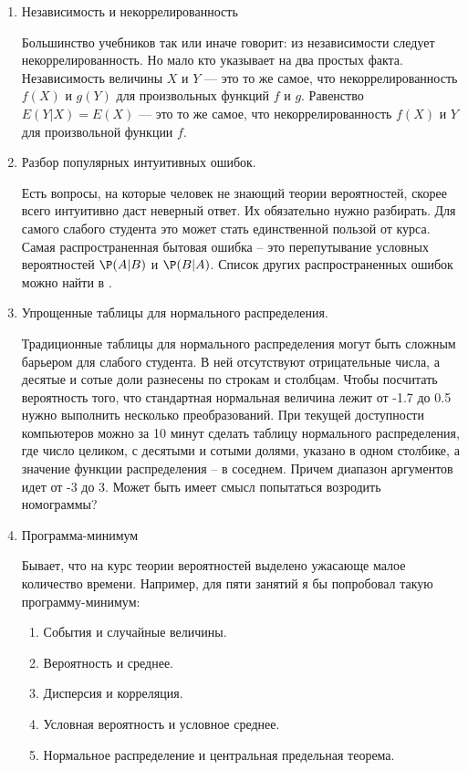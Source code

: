 \documentclass[pdftex,12pt,a4paper]{article}
\begin{document}
\begin{enumerate}
\item Независимость и некоррелированность

Большинство учебников так или иначе говорит: из независимости следует некоррелированность. Но мало кто указывает на два простых факта. Независимость величины $X$ и $Y$ --- это то же самое, что некоррелированность $f(X)$ и $g(Y)$ для произвольных  функций $f$ и $g$. Равенство $E(Y|X)=E(X)$ --- это то же самое, что некоррелированность $f(X)$ и $Y$ для произвольной  функции $f$.


\item Разбор популярных интуитивных ошибок.

Есть вопросы, на которые человек не знающий теории вероятностей, скорее всего интуитивно даст неверный ответ. Их обязательно нужно разбирать. Для самого слабого студента это может стать единственной пользой от курса. Самая распространенная бытовая ошибка – это перепутывание условных вероятностей $\P(A|B)$ и $\P(B|A)$. Список других распространенных ошибок можно найти в \cite{fischbein:misconceptions}.

\item Упрощенные таблицы для нормального распределения. 

Традиционные таблицы для нормального распределения могут быть сложным барьером для слабого студента. В ней отсутствуют отрицательные числа, а десятые и сотые доли разнесены по строкам и столбцам. Чтобы посчитать вероятность того, что стандартная нормальная величина лежит от -1.7 до 0.5 нужно выполнить несколько преобразований. При текущей доступности компьютеров можно за 10 минут сделать таблицу нормального распределения, где число целиком, с десятыми и сотыми долями, указано в одном столбике, а значение функции распределения – в соседнем. Причем диапазон аргументов идет от -3 до 3. Может быть имеет смысл попытаться возродить номограммы?

\item Программа-минимум

Бывает, что на курс теории вероятностей выделено ужасающе малое количество времени. Например, для пяти занятий я бы попробовал такую программу-минимум:
\begin{enumerate}
\item События и случайные величины. 
\item Вероятность и среднее.
\item Дисперсия и корреляция.
\item Условная вероятность и условное среднее.
\item Нормальное распределение и центральная предельная теорема.
\end{enumerate}



\end{enumerate}
\end{document}
